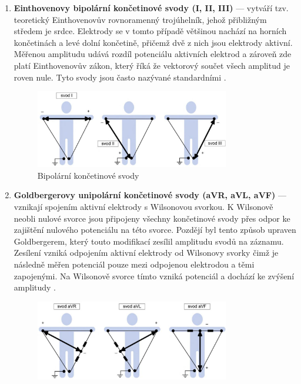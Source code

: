 \begin{enumerate}
	\item \textbf{Einthovenovy bipolární končetinové svody (I, II, III)} ---
	       vytváří tzv. teoretický Einthovenovův rovnoramenný trojúhelník, jehož
	       přibližným středem je srdce. Elektrody se v tomto případě většinou
	       nachází na horních končetinách a levé dolní končetině, přičemž dvě z
	       nich jsou elektrody aktivní. Měřenou amplitudu udává rozdíl
	       potenciálu aktivních elektrod a zároveň zde platí Einthovenovův
	       zákon, který říká že vektorový součet všech amplitud je roven nule.
	       Tyto svody jsou často nazývané standardními \cite{Kittnar2020}.
	      \begin{figure}[h]
		      \begin{center}
			      \includegraphics[width=0.8\textwidth]{../assets/anatomy/bipolar}
			      \caption{Bipolární končetinové svody \cite{Kittnar2020}}
			      \label{img:bipolar}
		      \end{center}
	      \end{figure}
	\item \textbf{Goldbergerovy unipolární končetinové svody (aVR, aVL, aVF)}
		  --- vznikají spojením aktivní elektrody s Wilsonovou svorkou. K
		  Wilsonově neobli nulové svorce jsou připojeny všechny končetinové
		  svody přes odpor ke zajištění nulového potenciálu na této svorce.
		  Pozdějí byl tento způsob upraven Goldbergerem, který touto modifikací
		  zesílil amplitudu svodů na záznamu. Zesílení vzniká odpojením aktivní
		  elektrody od Wilsonovy svorky čimž je následně měřen potenciál pouze
		  mezi odpojenou elektrodou a těmi zapojenými. Na Wilsonově svorce tímto
		  vzniká potenciál a dochází ke zvýšení amplitudy \cite{Kittnar2020}.
		\begin{figure}[h]
			\begin{center}
				\includegraphics[width=0.8\textwidth]{../assets/anatomy/unipolar1}

\end{center}
\end{figure}
\end{enumerate}
